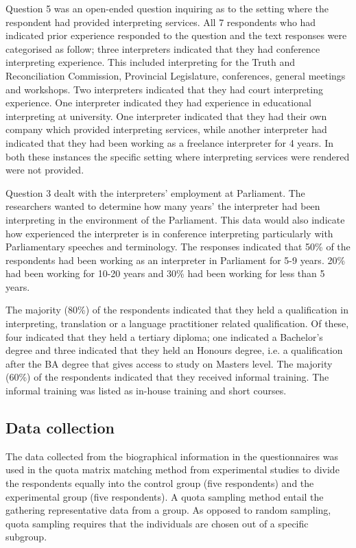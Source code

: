 \documentclass[output=paper]{langsci/langscibook}
\begin{document}
Question 5 was an open-ended question inquiring as to the setting where the respondent had provided interpreting services. All 7 respondents who had indicated prior experience responded to the question and the text responses were categorised as follow; three interpreters indicated that they had conference interpreting experience. This included interpreting for the Truth and Reconciliation Commission, Provincial Legislature, conferences, general meetings and workshops. Two interpreters indicated that they had court interpreting experience. One interpreter indicated they had experience in educational interpreting at university. One interpreter indicated that they had their own company which provided interpreting services, while another interpreter had indicated that they had been working as a freelance interpreter for 4 years. In both these instances the specific setting where interpreting services were rendered were not provided. 

Question 3 dealt with the interpreters’ employment at Parliament. The researchers wanted to determine how many years’ the interpreter had been interpreting in the environment of the Parliament. This data would also indicate how experienced the interpreter is in conference interpreting particularly with Parliamentary speeches and terminology. The responses indicated that 50\% of the respondents had been working as an interpreter in Parliament for 5-9 years. 20\% had been working for 10-20 years and 30\% had been working for less than 5 years. 

The majority (80\%) of the respondents indicated that they held a qualification in interpreting, translation or a language practitioner related qualification. Of these, four indicated that they held a tertiary diploma; one indicated a Bachelor’s degree and three indicated that they held an Honours degree, i.e. a qualification after the BA degree that gives access to study on Masters level. The majority (60\%) of the respondents indicated that they received informal training. The informal training was listed as in-house training and short courses.  


\subsection{Data collection}
The data collected from the biographical information in the questionnaires was used in the quota matrix matching method from experimental studies to divide the respondents equally into the control group (five respondents) and the experimental group (five respondents). A quota sampling method entail the gathering representative data from a group. As opposed to random sampling, quota sampling requires that the individuals are chosen out of a specific subgroup. 
\end{document}
